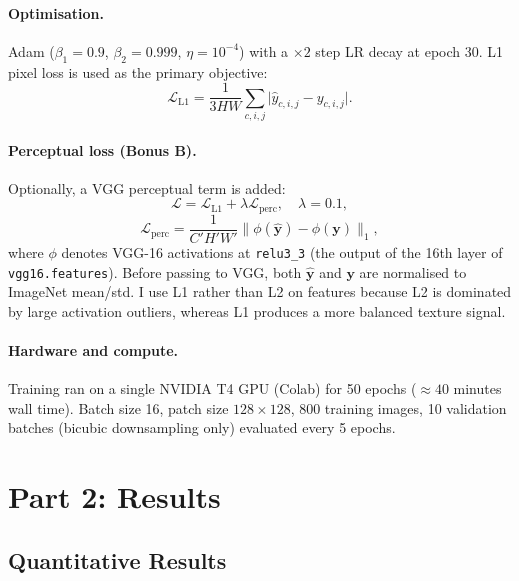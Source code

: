 \documentclass{article}
\begin{document}
\paragraph{Optimisation.}
Adam ($\beta_1 = 0.9$, $\beta_2 = 0.999$, $\eta = 10^{-4}$) with a $\times 2$
step LR decay at epoch 30.
L1 pixel loss is used as the primary objective:
\begin{equation}
  \mathcal{L}_{\text{L1}} = \frac{1}{3HW}
  \sum_{c,i,j} \bigl|\hat{y}_{c,i,j} - y_{c,i,j}\bigr|.
\end{equation}

\paragraph{Perceptual loss (Bonus B).}
Optionally, a VGG perceptual term is added:
\begin{equation}
  \mathcal{L} = \mathcal{L}_{\text{L1}} + \lambda \mathcal{L}_{\text{perc}},
  \quad \lambda = 0.1,
  \label{eq:perceptual}
\end{equation}
\begin{equation}
  \mathcal{L}_{\text{perc}} = \frac{1}{C'H'W'}
  \bigl\|\phi(\hat{\mathbf{y}}) - \phi(\mathbf{y})\bigr\|_1,
\end{equation}
where $\phi$ denotes VGG-16 activations at \texttt{relu3\_3} (the output of
the 16th layer of \texttt{vgg16.features}).
Before passing to VGG, both $\hat{\mathbf{y}}$ and $\mathbf{y}$ are normalised
to ImageNet mean/std.
I use L1 rather than L2 on features because L2 is dominated by large
activation outliers, whereas L1 produces a more balanced texture signal.

\paragraph{Hardware and compute.}
Training ran on a single NVIDIA T4 GPU (Colab) for 50 epochs
($\approx 40$ minutes wall time).
Batch size 16, patch size $128{\times}128$, 800 training images, 10 validation
batches (bicubic downsampling only) evaluated every 5 epochs.

\section{Part 2: Results}

\subsection{Quantitative Results}
\end{document}
